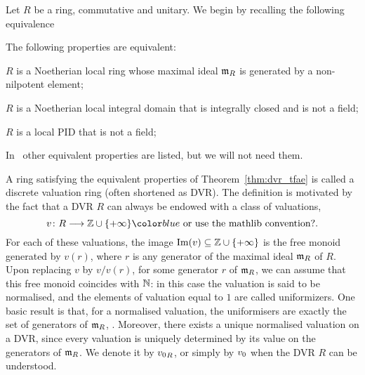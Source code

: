 \documentclass[sigplan,10pt,anonymous,review]{acmart}
\begin{document}
Let $R$ be a ring,  commutative and unitary. We begin by recalling the following equivalence
\begin{theorem}\label{thm:dvr_tfae}
The following properties are equivalent:
\begin{listResults}
\item $R$ is a Noetherian local ring whose maximal ideal $\mathfrak{m}_{R}$ is generated by a non-nilpotent element;
\item $R$ is a Noetherian local integral domain that is integrally closed and is not a field;
\item $R$ is a local PID that is not a field;
\end{listResults}
\end{theorem}
\begin{remark}
In~\cite[Chapitre~VI, \S3, n$^\circ$ 6, Proposition~8]{Bou85} other equivalent properties are listed, but we will not need them.
\end{remark}
A ring satisfying the equivalent properties of Theorem~\ref{thm:dvr_tfae} is called a discrete valuation ring (often shortened as DVR). The definition is motivated by the fact that a DVR $R$ can always be endowed with a class of valuations, 
\[
v\colon R\longrightarrow \ZZ\cup\{+\infty\}\fil{\text{ or use the mathlib convention?}}.
\]
For each of these valuations, the image $\operatorname{Im}(v)\subseteq\mathbb{Z}\cup \{+\infty\}$ is the free monoid generated by $v(r)$, where $r$ is any generator of the maximal ideal $\mathfrak{m}_{R}$ of $R$. Upon replacing $v$ by $v/v(r)$, for some generator $r$ of $\mathfrak{m}_{R}$, we can assume that this free monoid coincides with $\mathbb{N}$: in this case the valuation is said to be normalised, and the elements of valuation equal to $1$ are called uniformizers. One basic result is that, for a normalised valuation, the uniformisers are exactly the set of generators of $\mathfrak{m}_{R}$, . Moreover, there exists a unique normalised valuation on a DVR, since every valuation is uniquely determined by its value on the generators of $\mathfrak{m}_{R}$. We denote it by ${{v}_{0}}_R$, or simply by ${v}_{0}$ when the DVR $R$ can be understood.
\end{document}
